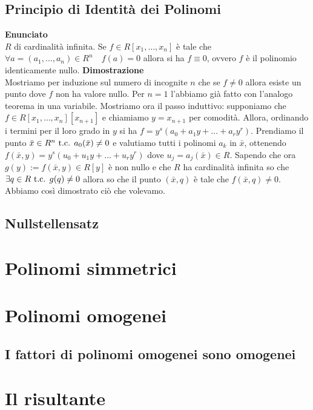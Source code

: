 \documentclass[a4paper,NoNotes,GeneralMath]{stdmdoc}
\newcommand{\Enunciato}{\vskip 0.05cm \noindent \textbf{Enunciato} \\ }
\renewcommand{\Dimostrazione}{\vskip 0.05cm \noindent \textbf{Dimostrazione} \\ }
\begin{document}
	\subsection{Principio di Identità dei Polinomi}
	\Enunciato $R$ di cardinalità infinita. Se $f \in R[x_1, \ldots, x_n]$ è tale che $\forall a = (a_1, \ldots, a_n) \in R^n \quad f(a) = 0$ allora si ha $f \equiv 0$, ovvero $f$ è il polinomio identicamente nullo.
	\Dimostrazione Mostriamo per induzione sul numero di incognite $n$ che se $f \neq 0$ allora esiste un punto dove $f$ non ha valore nullo. Per $n=1$ l'abbiamo già fatto con l'analogo teorema in una variabile. Mostriamo ora il passo induttivo: supponiamo che $f \in R[x_1, \ldots, x_n][x_{n+1}]$ e chiamiamo $y = x_{n+1}$ per comodità. Allora, ordinando i termini per il loro grado in $y$ si ha $f = y^s (a_0 + a_1 y + \ldots + a_r y^r)$. Prendiamo il punto $\bar{x} \in R^n \mbox{ t.c. } a_0(\bar{x}) \neq 0$ e valutiamo tutti i polinomi $a_k$ in $\bar{x}$, ottenendo $f(\bar{x}, y) = y^s (u_0 + u_1 y + \ldots + u_r y^r)$ dove $u_j = a_j(\bar{x}) \in R$. Sapendo che ora $g(y) := f(\bar{x}, y) \in R[y]$ è non nullo e che $R$ ha cardinalità infinita so che $\exists q \in R \mbox{ t.c. } g(q) \neq 0$ allora so che il punto $(\bar{x}, q)$ è tale che $f(\bar{x}, q) \neq 0$. Abbiamo così dimostrato ciò che volevamo.

	\subsection{Nullstellensatz}

	\section*{Polinomi simmetrici}

	\section*{Polinomi omogenei}
	\subsection{I fattori di polinomi omogenei sono omogenei}

	\section*{Il risultante}
\end{document}
